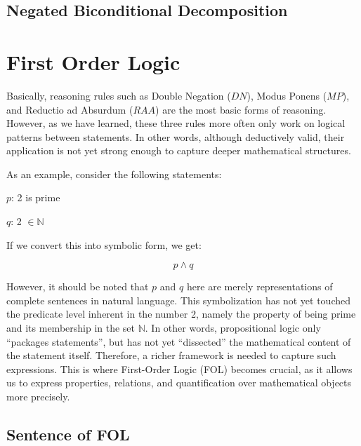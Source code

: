 \documentclass[12pt,a4paper,openany]{article}
\begin{document}
\subsection {Negated Biconditional Decomposition}
\begin{center}
\end{center}

\section{First Order Logic }

Basically, reasoning rules such as Double Negation (\(DN\)), Modus
Ponens (\(MP\)), and Reductio ad Absurdum (\(RAA\)) are the most basic
forms of reasoning. However, as we have learned, these three rules more
often only work on logical patterns between statements. In other words,
although deductively valid, their application is not yet strong enough
to capture deeper mathematical structures.

As an example, consider the following statements:

\(p\): 2 is prime

\(q\): 2 \(\in \mathbb{N}\)

If we convert this into symbolic form, we get:

\[p \land q\]

However, it should be noted that \(p\) and \(q\) here are merely
representations of complete sentences in natural language. This
symbolization has not yet touched the predicate level inherent in the
number 2, namely the property of being prime and its membership in the
set \(\mathbb{N}\). In other words, propositional logic only ``packages
statements'', but has not yet ``dissected'' the mathematical content of
the statement itself. Therefore, a richer framework is needed to capture
such expressions. This is where First-Order Logic (FOL) becomes crucial,
as it allows us to express properties, relations, and quantification
over mathematical objects more precisely.

\subsection{Sentence of FOL}\label{sentence-of-fol}
\end{document}
